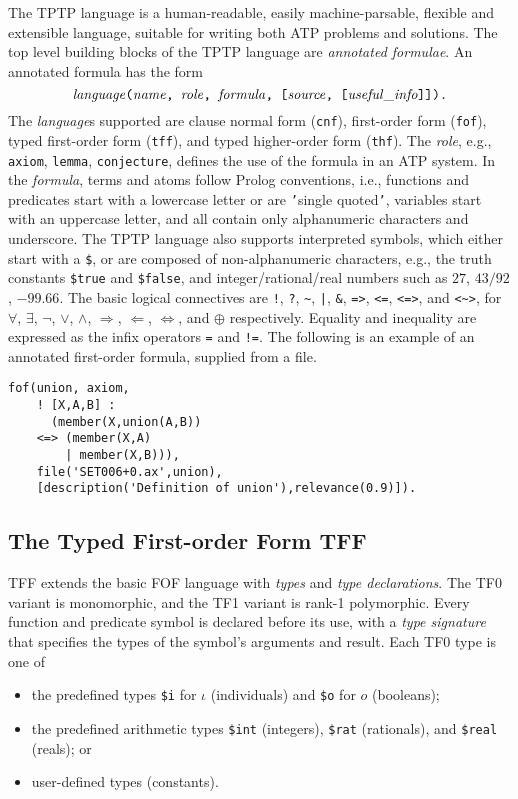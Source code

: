 The TPTP language is a human-readable, easily machine-parsable, flexible and
extensible language, suitable for writing both ATP problems and solutions.
The top level building blocks of the TPTP language are {\em annotated 
formulae}.
An annotated formula has the form $$\mathit{language}\text{\tt(}\mathit{name}\text{\tt, }\mathit{role}\text{\tt, }\mathit{formula}\text{\tt, [}\mathit{source}\text{\tt, [}\mathit{useful\_info}\text{\tt]]).}$$
The {\em language}s supported are clause normal form ({\tt cnf}),
first-order form ({\tt fof}), typed first-order form ({\tt tff}), and
typed higher-order form ({\tt thf}).
The {\em role}, e.g., {\tt axiom}, {\tt lemma}, {\tt conjecture},
defines the use of the formula in an ATP system.
In the {\em formula}, terms and atoms follow Prolog conventions, i.e.,
functions and predicates start with a lowercase letter or are {\tt '}single
quoted{\tt '}, variables start with an uppercase letter, and all
contain only alphanumeric characters and underscore.
The TPTP language also supports interpreted symbols, which either start with a
{\tt \$}, or are composed of non-alphanumeric characters, e.g., the truth
constants {\tt \$true} and {\tt \$false}, and integer/rational/real
numbers such as $27$, $43/92$, $-99.66$.
The basic logical connectives are
{\tt !}, {\tt ?}, {\tt \verb|~|}, {\tt |}, {\tt \&}, {\tt =>}, {\tt <=},
{\tt <=>}, and {\tt <\verb|~|>},
for
$\forall$, $\exists$, $\neg$, $\vee$, $\wedge$, $\Rightarrow$, $\Leftarrow$,
$\Leftrightarrow$, and $\oplus$ respectively.
Equality and inequality are expressed as the infix operators {\tt =} and
{\tt !=}.
The following is an example of an annotated first-order formula, supplied from a file.
\begin{verbatim}
fof(union, axiom,
    ! [X,A,B] :
      (member(X,union(A,B))
    <=> (member(X,A)
        | member(X,B))),
    file('SET006+0.ax',union),
    [description('Definition of union'),relevance(0.9)]).
\end{verbatim}

\subsection{The Typed First-order Form TFF}
\label{sec:tfx/TFF}

TFF extends the basic FOF language with {\em types} and {\em type
declarations}.
The TF0 variant is monomorphic, and the TF1 variant is rank-1 polymorphic.
Every function and predicate symbol is declared before its use, with
a {\em type signature} that specifies the types of the symbol's arguments
and result. Each TF0 type is one of
\begin{itemize}
\item the predefined types {\tt \$i} for $\iota$ (individuals) and
      {\tt \$o} for $o$ (booleans);
\item the predefined arithmetic types {\tt \$int} (integers), {\tt \$rat}
      (rationals), and {\tt \$real} (reals); or
\item user-defined types (constants).
\end{itemize}

